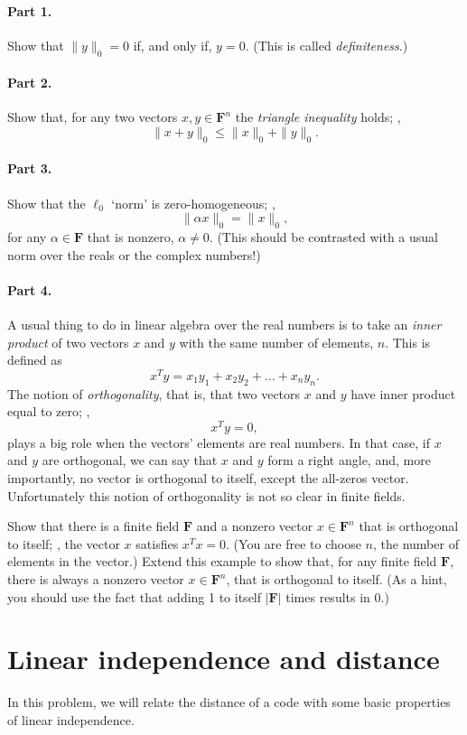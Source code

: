 \documentclass[12pt]{article}
\newcommand{\field}{\mathbf{F}}
\begin{document}
\paragraph{Part 1.} Show that $\|y\|_0 = 0$ if, and only if, $y = 0$. (This
is called \emph{definiteness}.)

\paragraph{Part 2.} Show that, for any two vectors $x, y \in \field^n$
the \emph{triangle inequality} holds; \ie,
\[
    \|x + y\|_0 \le \|x\|_0 + \|y\|_0.
\]

\paragraph{Part 3.} Show that the $\ell_0$ `norm' is zero-homogeneous; \ie,
\[
    \|\alpha x\|_0 = \|x\|_0,
\]
for any $\alpha \in \field$ that is nonzero, $\alpha \ne 0$. (This should be
contrasted with a usual norm over the reals or the complex numbers!)

\paragraph{Part 4.} A usual thing to do in linear algebra over the real
numbers is to take an \emph{inner product} of two vectors $x$ and $y$ with
the same number of elements, $n$. This is defined as
\[
    x^Ty = x_1y_1 + x_2y_2 + \dots + x_ny_n.
\]
The notion of \emph{orthogonality}, that is, that two vectors $x$ and $y$ have
inner product equal to zero; \ie,
\[
    x^Ty = 0,
\]
plays a big role when the vectors' elements are real numbers. In that case, if
$x$ and $y$ are orthogonal, we can say that $x$ and $y$ form a right angle,
and, more importantly, no vector is orthogonal to itself, except the all-zeros
vector. Unfortunately this notion of orthogonality is not so clear in finite
fields.

Show that there is a finite field $\field$ and a nonzero vector $x \in
\field^n$ that is orthogonal to itself; \ie, the vector $x$ satisfies $x^Tx =
0$. (You are free to choose $n$, the number of elements in the vector.) Extend
this example to show that, for any finite field $\field$, there is always a
nonzero vector $x \in \field^n$, that is orthogonal to itself. (As a hint, you
should use the fact that adding 1 to itself $|\field|$ times results in 0.)

\section{Linear independence and distance}
In this problem, we will relate the distance of a code with some basic
properties of linear independence.
\end{document}
